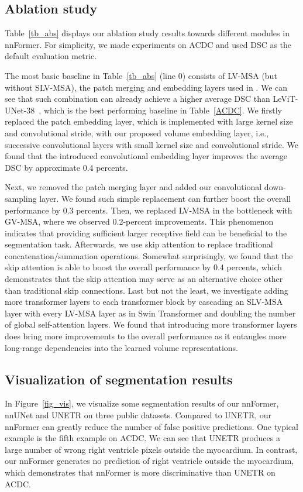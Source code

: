 \documentclass[journal,twoside,web]{ieeecolor}
\begin{document}
\subsection{Ablation study}
Table~\ref{tb_abs} displays our ablation study results towards different modules in nnFormer. For simplicity, we made experiments on ACDC and used DSC as the default evaluation metric.

The most basic baseline in Table~\ref{tb_abs} (line 0) consists of LV-MSA (but without SLV-MSA), the patch merging and embedding layers used in \cite{liu2021swin}. We can see that such combination can already achieve a higher average DSC than LeViT-UNet-38~\cite{xu2021levit}, which is the best performing baseline in Table~\ref{ACDC}. We firstly replaced the patch embedding layer, which is implemented with large kernel size and convolutional stride, with our proposed volume embedding layer, i.e., successive convolutional layers with small kernel size and convolutional stride. We found that the introduced convolutional embedding layer improves the average DSC by approximate 0.4 percents. 

Next, we removed the patch merging layer and added our convolutional down-sampling layer. We found such simple replacement can further boost the overall performance by 0.3 percents. Then, we replaced LV-MSA in the bottleneck with GV-MSA, where we observed 0.2-percent improvements. This phenomenon indicates that providing sufficient larger receptive field can be beneficial to the segmentation task. Afterwards, we use skip attention to replace traditional concatenation/summation operations. Somewhat surprisingly, we found that the skip attention is able to boost the overall performance by 0.4 percents, which demonstrates that the skip attention may serve as an alternative choice other than traditional skip connections. Last but not the least, we investigate adding more transformer layers to each transformer block by cascading an SLV-MSA layer with every LV-MSA layer as in Swin Transformer and doubling the number of global self-attention layers. We found that introducing more transformer layers does bring more improvements to the overall performance as it entangles more long-range dependencies into the learned volume representations. 

\subsection{Visualization of segmentation results}
In Figure~\ref{fig_vis}, we visualize some segmentation results of our nnFormer, nnUNet and UNETR on three public datasets. Compared to UNETR, our nnFormer can greatly reduce the number of false positive predictions. One typical example is the fifth example on ACDC. We can see that UNETR produces a large number of wrong right ventricle pixels outside the myocardium. In contrast, our nnFormer generates no prediction of right ventricle outside the myocardium, which demonstrates that nnFormer is more discriminative than UNETR on ACDC. 
\end{document}
